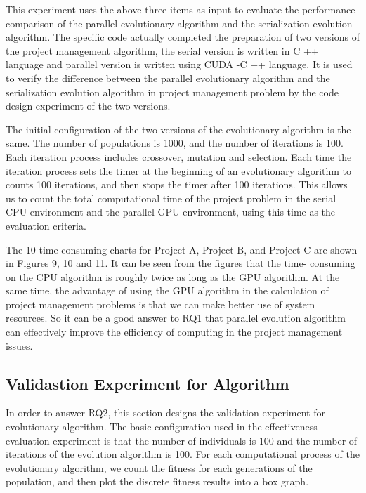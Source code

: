 This experiment uses the above three items as input to evaluate the 
performance comparison of the parallel evolutionary algorithm and the 
serialization evolution algorithm. The specific code actually completed the 
preparation of two versions of the project management algorithm, the serial 
version is written in C ++ language and parallel version is written using CUDA
-C ++ language. It is used to verify the difference between the parallel 
evolutionary algorithm and the serialization evolution algorithm in project 
management problem by the code design experiment of the two versions.

The initial configuration of the two versions of the evolutionary algorithm 
is the same. The number of populations is 1000, and the number of iterations 
is 100. Each iteration process includes crossover, mutation and selection. 
Each time the iteration process sets the timer at the beginning of an 
evolutionary algorithm to counts 100 iterations, and then stops the timer 
after 100 iterations. This allows us to count the total computational time of 
the project problem in the serial CPU environment and the parallel GPU 
environment, using this time as the evaluation criteria.

The 10 time-consuming charts for Project A, Project B, and Project C are 
shown in Figures 9, 10 and 11. It can be seen from the figures that the time-
consuming on the CPU algorithm is roughly twice as long as the GPU algorithm. 
At the same time, the advantage of using the GPU algorithm in the calculation 
of project management problems is that we can make better use of system 
resources. So it can be a good answer to RQ1 that parallel evolution 
algorithm can effectively improve the efficiency of computing in the project 
management issues.

\subsection{Validastion Experiment for Algorithm}
%
In order to answer RQ2, this section designs the validation experiment for 
evolutionary algorithm. The basic configuration used in the effectiveness 
evaluation experiment is that the number of individuals is 100 and the number 
of iterations of the evolution algorithm is 100. For each computational 
process of the evolutionary algorithm, we count the fitness for each 
generations of the population, and then plot the discrete fitness results 
into a box graph.

